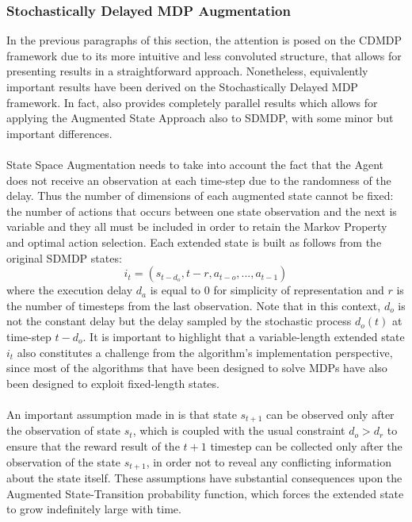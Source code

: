             \subsubsection{Stochastically Delayed MDP Augmentation}
                \label{subsubs:sdmdpaug}
                In the previous paragraphs of this section, the attention is posed on the CDMDP framework due to its more intuitive and less convoluted structure, that allows for presenting results in a straightforward approach. Nonetheless, equivalently important results have been derived on the Stochastically Delayed MDP framework. In fact,  also provides completely parallel results which allows for applying the Augmented State Approach also to SDMDP, with some minor but important differences.
                \\\\
                State Space Augmentation needs to take into account the fact that the Agent does not receive an observation at each time-step due to the randomness of the delay. Thus the number of dimensions of each augmented state cannot be fixed: the number of actions that occurs between one state observation and the next is variable and they all must be included in order to retain the Markov Property and optimal action selection. Each extended state is built as follows from the original SDMDP states:
                \[ i_t = \left( s_{t-d_o}, t-r, a_{t-o}, ..., a_{t-1} \right) \]
                where the execution delay $d_a$ is equal to 0 for simplicity of representation and $r$ is the number of timesteps from the last observation. Note that in this context, $d_o$ is not the constant delay but the delay sampled by the stochastic process $d_o(t)$ at time-step $t-d_o$. It is important to highlight that a variable-length extended state $i_t$ also constitutes a challenge from the algorithm's implementation perspective, since most of the algorithms that have been designed to solve MDPs have also been designed to exploit fixed-length states.
                \\\\
                An important assumption made in  is that state $s_{t+1}$ can be observed only after the observation of state $s_t$, which is coupled with the usual constraint $d_o > d_r$ to ensure that the reward result of the $t+1$ timestep can be collected only after the observation of the state $s_{t+1}$, in order not to reveal any conflicting information about the state itself. These assumptions have substantial consequences upon the Augmented State-Transition probability function, which forces the extended state to grow indefinitely large with time.
